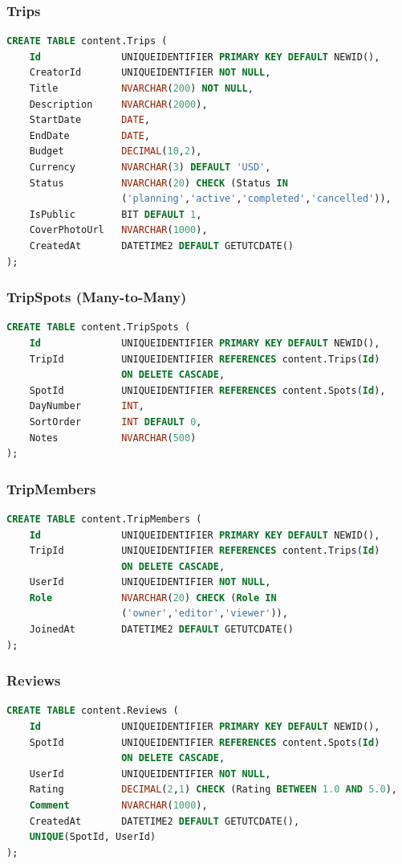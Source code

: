 \documentclass[12pt,letterpaper]{article}
\begin{document}
\subsubsection{Trips}
\begin{lstlisting}[style=code,language=SQL]
CREATE TABLE content.Trips (
    Id              UNIQUEIDENTIFIER PRIMARY KEY DEFAULT NEWID(),
    CreatorId       UNIQUEIDENTIFIER NOT NULL,
    Title           NVARCHAR(200) NOT NULL,
    Description     NVARCHAR(2000),
    StartDate       DATE,
    EndDate         DATE,
    Budget          DECIMAL(10,2),
    Currency        NVARCHAR(3) DEFAULT 'USD',
    Status          NVARCHAR(20) CHECK (Status IN
                    ('planning','active','completed','cancelled')),
    IsPublic        BIT DEFAULT 1,
    CoverPhotoUrl   NVARCHAR(1000),
    CreatedAt       DATETIME2 DEFAULT GETUTCDATE()
);
\end{lstlisting}

\subsubsection{TripSpots (Many-to-Many)}
\begin{lstlisting}[style=code,language=SQL]
CREATE TABLE content.TripSpots (
    Id              UNIQUEIDENTIFIER PRIMARY KEY DEFAULT NEWID(),
    TripId          UNIQUEIDENTIFIER REFERENCES content.Trips(Id)
                    ON DELETE CASCADE,
    SpotId          UNIQUEIDENTIFIER REFERENCES content.Spots(Id),
    DayNumber       INT,
    SortOrder       INT DEFAULT 0,
    Notes           NVARCHAR(500)
);
\end{lstlisting}

\subsubsection{TripMembers}
\begin{lstlisting}[style=code,language=SQL]
CREATE TABLE content.TripMembers (
    Id              UNIQUEIDENTIFIER PRIMARY KEY DEFAULT NEWID(),
    TripId          UNIQUEIDENTIFIER REFERENCES content.Trips(Id)
                    ON DELETE CASCADE,
    UserId          UNIQUEIDENTIFIER NOT NULL,
    Role            NVARCHAR(20) CHECK (Role IN
                    ('owner','editor','viewer')),
    JoinedAt        DATETIME2 DEFAULT GETUTCDATE()
);
\end{lstlisting}

\subsubsection{Reviews}
\begin{lstlisting}[style=code,language=SQL]
CREATE TABLE content.Reviews (
    Id              UNIQUEIDENTIFIER PRIMARY KEY DEFAULT NEWID(),
    SpotId          UNIQUEIDENTIFIER REFERENCES content.Spots(Id)
                    ON DELETE CASCADE,
    UserId          UNIQUEIDENTIFIER NOT NULL,
    Rating          DECIMAL(2,1) CHECK (Rating BETWEEN 1.0 AND 5.0),
    Comment         NVARCHAR(1000),
    CreatedAt       DATETIME2 DEFAULT GETUTCDATE(),
    UNIQUE(SpotId, UserId)
);
\end{lstlisting}
\end{document}
